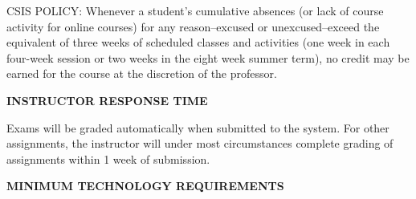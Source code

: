 \documentclass[12pt]{letter}
\begin{document}
\par CSIS POLICY: Whenever a student's cumulative absences (or lack of course activity for online courses) for any reason--excused or unexcused--exceed the equivalent of three weeks of scheduled classes and activities (one week in each four-week session or two weeks in the eight week summer term), no credit may be earned for the course at the discretion of the professor.


\textbf{INSTRUCTOR RESPONSE TIME} \par
Exams will be graded automatically when submitted to the system. For other assignments, the instructor will under most circumstances complete grading of assignments within 1 week of submission.


\textbf{MINIMUM TECHNOLOGY REQUIREMENTS}
\end{document}
